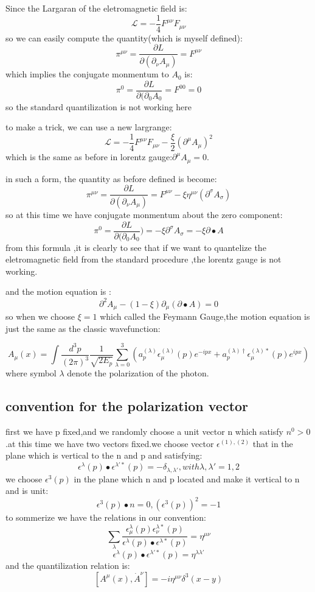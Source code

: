 Since the Largaran of the eletromagnetic field is:
\[\mathcal{L}=-\frac{1}{4}F^{\mu\nu}F_{\mu\nu}\]
so we can easily compute the quantity(which is myself defined):
\[\pi^{\mu\nu}=\frac{\partial L}{\partial (\partial_{\nu} A_\mu)}=F^{\mu\nu}\]
which implies the conjugate monmentum to $A_0$ is:
\[\pi^0=\frac{\partial L}{\partial (\partial_{0} A_0}=F^{00}=0\]
so the standard quantilization is not working here\par
to make a trick, we can use a new largrange:
\[\mathcal{L}=-\frac{1}{4}F^{\mu\nu}F_{\mu\nu}-\frac{\xi}{2}(\partial^\mu A_\mu)^2\]
which is the same as before in lorentz gauge:$\partial^\mu A_\mu=0$.\par
in such a form, the quantity as before defined is become:
\[\pi^{\mu\nu}=\frac{\partial L}{\partial (\partial_{\nu} A_\mu)}=F^{\mu\nu}-\xi\eta^{\mu\nu}(\partial^\sigma A_\sigma)\]
so at this time we have conjugate monmentum about the zero component:
\[\pi^0=\frac{\partial L}{\partial (\partial_{0} A_0})=-\xi\partial^\sigma A_\sigma=-\xi \partial\bullet A\]
from this formula ,it is clearly to see that if we want to quantelize the eletromagnetic field from the standard procedure ,the lorentz gauge is not working.\par
and the motion equation is :
\[\partial^2 A_\mu-(1-\xi)\partial_\mu(\partial\bullet A)=0\]
so when we choose $\xi=1$ which called the Feymann Gauge,the motion equation is just the same as the classic wavefunction:\par
\[A_\mu(x)=\int\frac{d^3 p}{(2\pi)^3}\frac{1}{\sqrt{2E_p}}\sum_{\lambda=0}^3(a_p^{(\lambda)}\epsilon_\mu^{(\lambda)}(p)e^{-ipx}+a_p^{(\lambda)\dagger}\epsilon_\mu^{(\lambda)*}(p)e^{ipx})\]
where symbol $\lambda$ denote the polarization of the photon.\par
\subsection{convention for the polarization vector}
first we have p fixed,and we randomly choose a unit vector n which satisfy $n^0>0$.at this time we have two vectors fixed.we choose vector $\epsilon^{(1),(2)}$ that in the plane which is vertical to the n and p and satisfying:
\[\epsilon^{\lambda}(p)\bullet \epsilon^{\lambda'*}(p)=-\delta_{\lambda,\lambda'} , with \lambda,\lambda'=1,2\]
we choose $\epsilon^3(p)$ in the plane which n and p located and make it vertical to n and is unit:
\[\epsilon^3(p)\bullet n=0, (\epsilon^3(p))^2=-1\]
to sommerize we have the relations in our convention:
\[\sum_{\lambda}\frac{\epsilon_\mu^\lambda(p)\epsilon_\nu^{\lambda *}(p)}{\epsilon^\lambda(p)\bullet\epsilon^{\lambda*}(p)}=\eta^{\mu\nu}\]
\[\epsilon^\lambda(p)\bullet\epsilon^{\lambda'*}(p)=\eta^{\lambda\lambda'}\]
and the quantilization relation is:
\[[A^\mu(x),\dot{A}^{\nu}]=-i\eta^{\mu\nu}\delta^3(x-y)\]